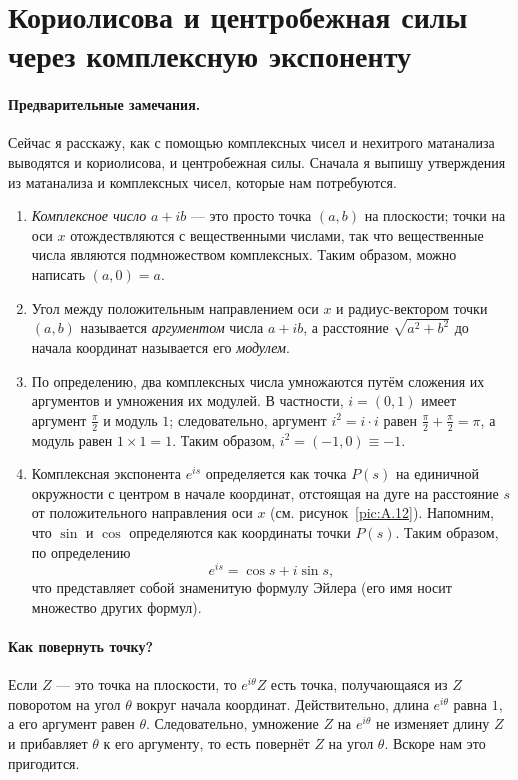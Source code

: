 \section{Кориолисова и центробежная силы через комплексную экспоненту}\label{sec:A.9}

\paragraph{Предварительные замечания.}
Сейчас я расскажу, как с помощью комплексных чисел и нехитрого матанализа выводятся и кориолисова, и центробежная силы.
Сначала я выпишу утверждения из матанализа и комплексных чисел, которые нам потребуются.

\begin{enumerate}
\item \emph{Комплексное число} $a+ib$ --- это просто точка $(a, b)$ на плоскости;
точки на оси $x$ отождествляются с вещественными числами, так что вещественные числа являются подмножеством комплексных.
Таким образом, можно написать $(a, 0)=a$.

\item Угол между положительным направлением оси $x$ и радиус-вектором точки $(a, b)$ называется
\textit{аргументом} числа $a+ib$, а расстояние $\sqrt{a^2+b^2}$ до начала координат называется
его \textit{модулем}.

\item По определению, два комплексных числа умножаются путём сложения их аргументов и умножения их модулей.
В частности, $i=(0, 1)$ имеет аргумент $\tfrac\pi2$ и модуль $1$;
следовательно, аргумент $i^2=i \cdot i$ равен $\tfrac\pi2+\tfrac\pi2=\pi$, а модуль равен $1\times1=1$.
Таким образом, $i^2=(-1,0)\equiv-1$.

\item Комплексная экспонента $e^{is}$ определяется как точка $P(s)$ на единичной окружности с центром в начале координат, отстоящая на дуге на расстояние $s$ от положительного направления оси $x$ (см. рисунок~\ref{pic:A.12}).
Напомним, что $\sin$ и $\cos$ определяются как координаты точки $P(s)$.
Таким образом, по определению
\[e^{is}=\cos s+i\sin s,\]
что представляет собой знаменитую формулу Эйлера (его имя носит множество других формул).

\end{enumerate}

\paragraph{Как повернуть точку?}
Если $Z$ --- это точка на плоскости, то
$e^{i\theta} Z$ есть точка, получающаяся из $Z$ поворотом на угол $\theta$ вокруг начала координат.
Действительно, длина $e^{i\theta}$ равна $1$, а его аргумент равен $\theta$.
Следовательно, умножение $Z$ на $e^{i\theta}$ не изменяет длину $Z$ и прибавляет $\theta$ к его аргументу, то есть повернёт $Z$ на угол $\theta$.
Вскоре нам это пригодится.


